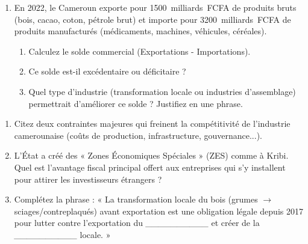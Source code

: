 \documentclass[11pt]{article}
\begin{document}
\begin{exercice}
\begin{enumerate}
    \item En 2022, le Cameroun exporte pour \SI{1500}{milliards FCFA} de produits bruts (bois, cacao, coton, pétrole brut) et importe pour \SI{3200}{milliards FCFA} de produits manufacturés (médicaments, machines, véhicules, céréales).
    \begin{enumerate}
        \item Calculez le solde commercial (Exportations - Importations).
        \item Ce solde est-il excédentaire ou déficitaire ?
        \item Quel type d'industrie (transformation locale ou industries d'assemblage) permettrait d'améliorer ce solde ? Justifiez en une phrase.
    \end{enumerate}
\end{enumerate}
\end{exercice}

\begin{exercice}
\begin{enumerate}
    \item Citez deux contraintes majeures qui freinent la compétitivité de l'industrie camerounaise (coûts de production, infrastructure, gouvernance...).
    \item L'État a créé des « Zones Économiques Spéciales » (ZES) comme à Kribi. Quel est l'avantage fiscal principal offert aux entreprises qui s'y installent pour attirer les investisseurs étrangers ?
    \item Complétez la phrase : « La transformation locale du bois (grumes $\rightarrow$ sciages/contreplaqués) avant exportation est une obligation légale depuis 2017 pour lutter contre l'exportation du \textit{\_\_\_\_\_\_\_\_\_\_} et créer de la \textit{\_\_\_\_\_\_\_\_\_\_} locale. »
\end{enumerate}
\end{exercice}
\end{document}
